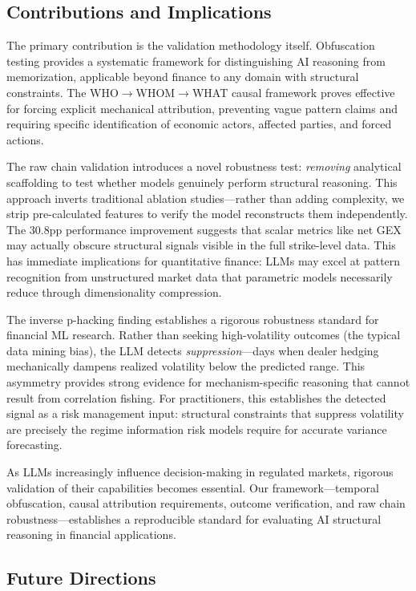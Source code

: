 \subsection{Contributions and Implications}

The primary contribution is the validation methodology itself. Obfuscation testing provides a systematic framework for distinguishing AI reasoning from memorization, applicable beyond finance to any domain with structural constraints. The WHO$\rightarrow$WHOM$\rightarrow$WHAT causal framework proves effective for forcing explicit mechanical attribution, preventing vague pattern claims and requiring specific identification of economic actors, affected parties, and forced actions.

The raw chain validation introduces a novel robustness test: \textit{removing} analytical scaffolding to test whether models genuinely perform structural reasoning. This approach inverts traditional ablation studies—rather than adding complexity, we strip pre-calculated features to verify the model reconstructs them independently. The 30.8pp performance improvement suggests that scalar metrics like net GEX may actually obscure structural signals visible in the full strike-level data. This has immediate implications for quantitative finance: LLMs may excel at pattern recognition from unstructured market data that parametric models necessarily reduce through dimensionality compression.

The inverse p-hacking finding establishes a rigorous robustness standard for financial ML research. Rather than seeking high-volatility outcomes (the typical data mining bias), the LLM detects \textit{suppression}—days when dealer hedging mechanically dampens realized volatility below the predicted range. This asymmetry provides strong evidence for mechanism-specific reasoning that cannot result from correlation fishing. For practitioners, this establishes the detected signal as a risk management input: structural constraints that suppress volatility are precisely the regime information risk models require for accurate variance forecasting.

As LLMs increasingly influence decision-making in regulated markets, rigorous validation of their capabilities becomes essential. Our framework—temporal obfuscation, causal attribution requirements, outcome verification, and raw chain robustness—establishes a reproducible standard for evaluating AI structural reasoning in financial applications.

\subsection{Future Directions}

